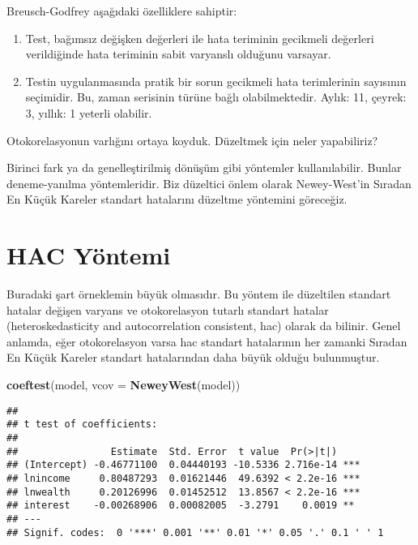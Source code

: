 \documentclass[
]{book}
\newenvironment{Shaded}{\begin{snugshade}}{\end{snugshade}}
\newcommand{\DataTypeTok}[1]{\textcolor[rgb]{0.13,0.29,0.53}{#1}}
\newcommand{\KeywordTok}[1]{\textcolor[rgb]{0.13,0.29,0.53}{\textbf{#1}}}
\newcommand{\NormalTok}[1]{#1}
\begin{document}
Breusch-Godfrey aşağıdaki özelliklere sahiptir:

\begin{enumerate}
\def\labelenumi{\roman{enumi}.}
\item
  Test, bağımsız değişken değerleri ile hata teriminin gecikmeli değerleri verildiğinde hata teriminin sabit varyanslı olduğunu varsayar.
\item
  Testin uygulanmasında pratik bir sorun gecikmeli hata terimlerinin sayısının seçimidir. Bu, zaman serisinin türüne bağlı olabilmektedir. Aylık: 11, çeyrek: 3, yıllık: 1 yeterli olabilir.
\end{enumerate}

Otokorelasyonun varlığını ortaya koyduk. Düzeltmek için neler yapabiliriz?

Birinci fark ya da genelleştirilmiş dönüşüm gibi yöntemler kullanılabilir. Bunlar deneme-yanılma yöntemleridir. Biz düzeltici önlem olarak Newey-West'in Sıradan En Küçük Kareler standart hatalarını düzeltme yöntemini göreceğiz.

\hypertarget{hac-yuxf6ntemi}{%
\section{HAC Yöntemi}\label{hac-yuxf6ntemi}}

Buradaki şart örneklemin büyük olmasıdır. Bu yöntem ile düzeltilen standart hatalar değişen varyans ve otokorelasyon tutarlı standart hatalar (heteroskedasticity and autocorrelation consistent, hac) olarak da bilinir. Genel anlamda, eğer otokorelasyon varsa hac standart hatalarının her zamanki Sıradan En Küçük Kareler standart hatalarından daha büyük olduğu bulunmuştur.

\begin{Shaded}
\begin{Highlighting}[]
\KeywordTok{coeftest}\NormalTok{(model, }\DataTypeTok{vcov =} \KeywordTok{NeweyWest}\NormalTok{(model))}
\end{Highlighting}
\end{Shaded}

\begin{verbatim}
## 
## t test of coefficients:
## 
##                Estimate  Std. Error  t value  Pr(>|t|)    
## (Intercept) -0.46771100  0.04440193 -10.5336 2.716e-14 ***
## lnincome     0.80487293  0.01621446  49.6392 < 2.2e-16 ***
## lnwealth     0.20126996  0.01452512  13.8567 < 2.2e-16 ***
## interest    -0.00268906  0.00082005  -3.2791    0.0019 ** 
## ---
## Signif. codes:  0 '***' 0.001 '**' 0.01 '*' 0.05 '.' 0.1 ' ' 1
\end{verbatim}
\end{document}
